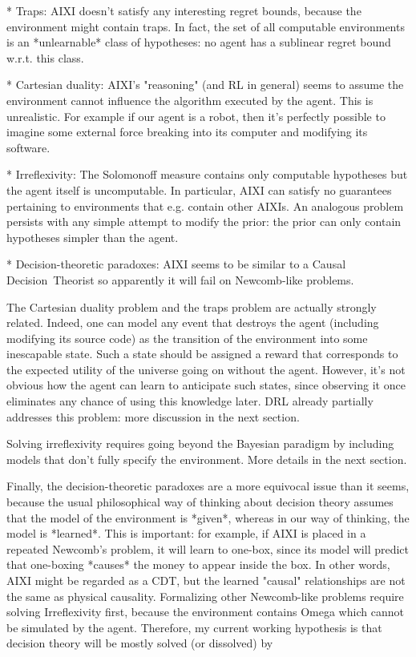 \documentclass[a4paper]{article}
\begin{document}
* Traps: AIXI doesn't satisfy any interesting regret bounds, because the environment might contain traps. In fact, the set of all computable environments is an *unlearnable* class of hypotheses: no agent has a sublinear regret bound w.r.t. this class.

* Cartesian duality: AIXI's "reasoning" (and RL in general) seems to assume the environment cannot influence the algorithm executed by the agent. This is unrealistic. For example if our agent is a robot, then it's perfectly possible to imagine some external force breaking into its computer and modifying its software.

* Irreflexivity: The Solomonoff measure contains only computable hypotheses but the agent itself is uncomputable. In particular, AIXI can satisfy no guarantees pertaining to environments that e.g. contain other AIXIs. An analogous problem persists with any simple attempt to modify the prior: the prior can only contain hypotheses simpler than the agent.

* Decision-theoretic paradoxes: AIXI seems to be similar to a Causal Decision\ Theorist so apparently it will fail on Newcomb-like problems.

The Cartesian duality problem and the traps problem are actually strongly related. Indeed, one can model any event that destroys the agent (including modifying its source code) as the transition of the environment into some inescapable state. Such a state should be assigned a reward that corresponds to the expected utility of the universe going on without the agent. However, it's not obvious how the agent can learn to anticipate such states, since observing it once eliminates any chance of using this knowledge later. DRL already partially addresses this problem: more discussion in the next section.

Solving irreflexivity requires going beyond the Bayesian paradigm by including models that don't fully specify the environment. More details in the next section.

Finally, the decision-theoretic paradoxes are a more equivocal issue than it seems, because the usual philosophical way of thinking about decision theory assumes that the model of the environment is *given*, whereas in our way of thinking, the model is *learned*. This is important: for example, if AIXI is placed in a repeated Newcomb's problem, it will learn to one-box, since its model will predict that one-boxing *causes* the money to appear inside the box. In other words, AIXI might be regarded as a CDT, but the learned "causal" relationships are not the same as physical causality. Formalizing other Newcomb-like problems require solving Irreflexivity first, because the environment contains Omega which cannot be simulated by the agent. Therefore, my current working hypothesis is that decision theory will be mostly solved (or dissolved) by
\end{document}
